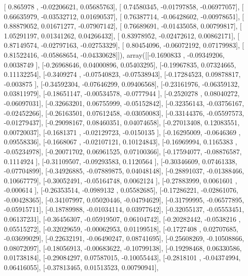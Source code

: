 \documentclass{article}
\begin{document}
       [ 0.865978  , -0.02206621,  0.05685763],
       [ 0.74580345, -0.01797858, -0.06977057],
       [ 0.66635979, -0.03532712,  0.01690537],
       [ 0.76387714, -0.06428602, -0.00978651],
       [ 0.88879052,  0.01671277, -0.07907142],
       [ 0.76689691, -0.01435058,  0.00799817],
       [ 1.05291197,  0.01341262,  0.04266432],
       [ 0.83978952, -0.02472612,  0.00862171],
       [ 0.87149574, -0.02797163, -0.02753329],
       [ 0.80454096, -0.06072192,  0.07179983],
       [ 0.81522416, -0.05868654, -0.04330628]]), array([[-0.1690833 , -0.09349206,  0.0038749 ],
       [-0.26968646,  0.04000896,  0.05403295],
       [-0.19967835,  0.07324665,  0.11132254],
       [-0.3409274 , -0.07540823, -0.07538943],
       [-0.17284523,  0.09878817, -0.003875  ],
       [-0.34592304, -0.07646299,  0.09406568],
       [-0.23161976, -0.06359132,  0.03811979],
       [-0.18651147, -0.00534578, -0.0777944 ],
       [-0.2520278 ,  0.08040272, -0.06097031],
       [-0.32663201,  0.06755999, -0.05152842],
       [-0.32356143, -0.03756167, -0.02452266],
       [-0.26163501,  0.07612458, -0.03050083],
       [-0.33144376, -0.05597573, -0.01279437],
       [-0.29098167,  0.08460351,  0.04074658],
       [-0.27013408,  0.12083551,  0.00720037],
       [-0.1681371 , -0.02129723, -0.0150135 ],
       [-0.16295009, -0.0646369 ,  0.09558336],
       [-0.1668067 , -0.02107121,  0.10124843],
       [-0.16969994,  0.1165383 , -0.05234978],
       [-0.20071702,  0.06961525,  0.07100366],
       [-0.17594077, -0.08876587,  0.1114924 ],
       [-0.31109507, -0.09293583,  0.1120564 ],
       [-0.30346609,  0.07461338, -0.07704899],
       [-0.34926885, -0.07889875,  0.04048148],
       [-0.28891037, -0.01388466,  0.10667779],
       [-0.30052491, -0.05164748,  0.0062124 ],
       [-0.27883999,  0.0061601 , -0.000614  ],
       [-0.26353514, -0.0989132 ,  0.05582685],
       [-0.17286221, -0.02861076, -0.00428365],
       [-0.34107997,  0.05020446, -0.04794629],
       [-0.31799995, -0.06577895, -0.05915711],
       [-0.18789988, -0.01034114,  0.03977642],
       [-0.32055137, -0.05553451,  0.06137231],
       [-0.36456307, -0.05919507,  0.06104742],
       [-0.20282442, -0.0538216 ,  0.05515272],
       [-0.32029659, -0.00062953,  0.01199518],
       [-0.1727408 ,  0.02707685, -0.03699029],
       [-0.22632191, -0.06490247,  0.08741695],
       [-0.25608269, -0.10508866,  0.08072097],
       [-0.18056913, -0.00683622, -0.10799138],
       [-0.19298468,  0.06330586,  0.01738184],
       [-0.29084297,  0.07587015, -0.10055443],
       [-0.2818101 , -0.04374994,  0.06416055],
       [-0.37813465,  0.01513523,  0.00790941],
\end{document}
